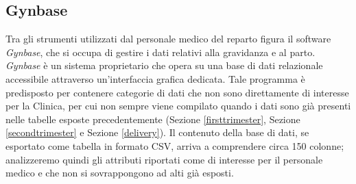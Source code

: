 \subsection{Gynbase}
\label{gynbase}
\newcommand{\Gynbase}{\emph{Gynbase}}

Tra gli strumenti utilizzati dal personale medico del reparto figura il software \Gynbase{}, che si occupa di gestire i dati relativi alla gravidanza e al parto.
\Gynbase{} è un sistema proprietario che opera su una base di dati relazionale accessibile attraverso un'interfaccia grafica dedicata.
Tale programma è predisposto per contenere categorie di dati che non sono direttamente di interesse per la Clinica, per cui non sempre viene compilato quando i dati sono già presenti nelle tabelle esposte precedentemente (Sezione \ref{firsttrimester}, Sezione \ref{secondtrimester} e Sezione \ref{delivery}).
Il contenuto della base di dati, se esportato come tabella in formato CSV, arriva a comprendere circa 150 colonne; analizzeremo quindi gli attributi riportati come di interesse per il personale medico e che non si sovrappongono ad alti già esposti.

